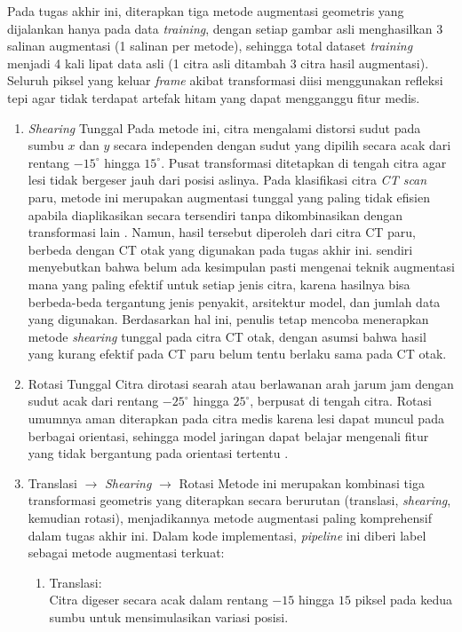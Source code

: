 Pada tugas akhir ini, diterapkan tiga metode augmentasi geometris yang dijalankan hanya pada data \textit{training}, dengan setiap gambar asli menghasilkan 3 salinan augmentasi (1 salinan per metode), sehingga total dataset \textit{training} menjadi 4 kali lipat data asli (1 citra asli ditambah 3 citra hasil augmentasi). Seluruh piksel yang keluar \textit{frame} akibat transformasi diisi menggunakan refleksi tepi agar tidak terdapat artefak hitam yang dapat mengganggu fitur medis. 
\begin{enumerate} 
	\item \textit{Shearing} Tunggal
	Pada metode ini, citra mengalami distorsi sudut pada sumbu $x$ dan $y$ secara independen dengan sudut yang dipilih secara acak dari rentang $-15^\circ$ hingga $15^\circ$. Pusat transformasi ditetapkan di tengah citra agar lesi tidak bergeser jauh dari posisi aslinya. Pada klasifikasi citra \textit{CT scan} paru, metode ini merupakan augmentasi tunggal yang paling tidak efisien apabila diaplikasikan secara tersendiri tanpa dikombinasikan dengan transformasi lain \autocite{goceri2023medical}. Namun, hasil tersebut diperoleh dari citra CT paru, berbeda dengan CT otak yang digunakan pada tugas akhir ini. \autocite{goceri2023medical} sendiri menyebutkan bahwa belum ada kesimpulan pasti mengenai teknik augmentasi mana yang paling efektif untuk setiap jenis citra, karena hasilnya bisa berbeda-beda tergantung jenis penyakit, arsitektur model, dan jumlah data yang digunakan. Berdasarkan hal ini, penulis tetap mencoba menerapkan metode \textit{shearing} tunggal pada citra CT otak, dengan asumsi bahwa hasil yang kurang efektif pada CT paru belum tentu berlaku sama pada CT otak.
	
	\item Rotasi Tunggal
	Citra dirotasi searah atau berlawanan arah jarum jam dengan sudut acak dari rentang $-25^\circ$ hingga $25^\circ$, berpusat di tengah citra. Rotasi umumnya aman diterapkan pada citra medis karena lesi dapat muncul pada berbagai orientasi, sehingga model jaringan dapat belajar mengenali fitur yang tidak bergantung pada orientasi tertentu \autocite{goceri2023medical}.
	
	\item Translasi $\to$ \textit{Shearing} $\to$ Rotasi
	Metode ini merupakan kombinasi tiga transformasi geometris yang diterapkan secara berurutan (translasi, \textit{shearing}, kemudian rotasi), menjadikannya metode augmentasi paling komprehensif dalam tugas akhir ini. Dalam kode implementasi, \textit{pipeline} ini diberi label sebagai metode augmentasi terkuat:
	\begin{enumerate}
		\item Translasi: \\ Citra digeser secara acak dalam rentang $-15$ hingga $15$ piksel pada kedua sumbu untuk mensimulasikan variasi posisi.
		

\end{enumerate}
\end{enumerate}
